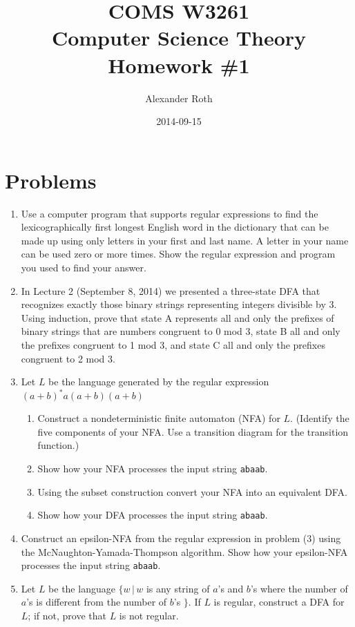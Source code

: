 \documentclass[]{article}
\begin{document}
\newtheorem{thm}{Theorem}

\title{COMS W3261 \\ Computer Science Theory \\ Homework \#1}
\author{Alexander Roth}
\date{2014-09-15}
\maketitle

\section*{Problems}
  \begin{enumerate}
    \item Use a computer program that supports regular expressions to find the 
    lexicographically first longest English word in the dictionary that can be
    made up using only letters in your first and last name. A letter in your 
    name can be used zero or more times. Show the regular expression and program
    you used to find your answer.
    \item In Lecture 2 (September 8, 2014) we presented a three-state DFA that
    recognizes exactly those binary strings representing integers divisible by 
    3. Using induction, prove that state A represents all and only the prefixes 
    of binary strings that are numbers congruent to 0 mod 3, state B all and 
    only the prefixes congruent to 1 mod 3, and state C all and only the 
    prefixes congruent to 2 mod 3.
    \item Let $L$ be the language generated by the regular expression 
    $(a+b)^*a(a+b)(a+b)$
      \begin{enumerate}
        \item Construct a nondeterministic finite automaton (NFA) for $L$. 
        (Identify the five components of your NFA. Use a transition diagram for 
        the transition function.)
        \item Show how your NFA processes the input string \texttt{abaab}.
        \item Using the subset construction convert your NFA into an equivalent 
        DFA.
        \item Show how your DFA processes the input string \texttt{abaab}.
      \end{enumerate}
    \item Construct an epsilon-NFA from the regular expression in problem (3) 
    using the McNaughton-Yamada-Thompson algorithm. Show how your epsilon-NFA 
    processes the input string \texttt{abaab}.
    \item Let $L$ be the language $\{ w \, | \, w$ is any string of $a$'s and $b
    $'s where the number of $a$'s is different from the number of $b$'s $\}$. If 
    $L$ is regular, construct a DFA for $L$; if not, prove that $L$ is not 
    regular.
  \end{enumerate}
\end{document}
